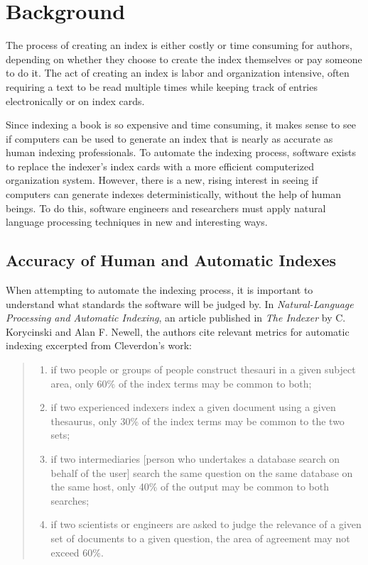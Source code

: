 \section{Background}
The process of creating an index is either costly or time consuming for authors, depending on whether they choose to create the index themselves or pay someone to do it.
The act of creating an index is labor and organization intensive, often requiring a text to be read multiple times while keeping track of entries electronically or on index cards.

Since indexing a book is so expensive and time consuming, it makes sense to see if computers can be used to generate an index that is nearly as accurate as human indexing professionals.
To automate the indexing process, software exists to replace the indexer's index cards with a more efficient computerized organization system.
However, there is a new, rising interest in seeing if computers can generate indexes deterministically, without the help of human beings.
To do this, software engineers and researchers must apply natural language processing techniques in new and interesting ways.

\subsection{Accuracy of Human and Automatic Indexes}

When attempting to automate the indexing process, it is important to understand what standards the software will be judged by.
In {\it Natural-Language Processing and Automatic Indexing}, an article published in {\it The Indexer} by C. Korycinski and Alan F. Newell, the authors cite relevant metrics for automatic indexing excerpted from Cleverdon's work:

\begin{quote}
\begin{enumerate}
\item if two people or groups of people construct thesauri in a given subject area, only 60\% of the index terms may be common to both;
\item if two experienced indexers index a given document using a given thesaurus, only 30\% of the index terms may be common to the two sets;
\item if two intermediaries [person who undertakes a database search on behalf of the user] search the same question on the same database on the same host, only 40\% of the output may be common to both searches;
\item if two scientists or engineers are asked to judge the relevance of a given set of documents to a given question, the area of agreement may not exceed 60\%.~\cite{automatic-indexing}
\end{enumerate}
\end{quote}

